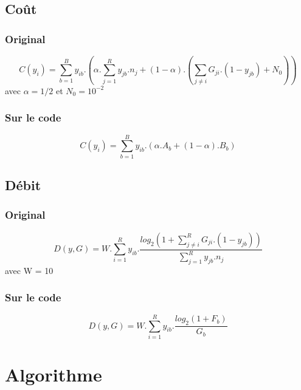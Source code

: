 \documentclass[a4paper,sans,titlepage,10pt]{article}
\begin{document}
\subsection{Coût}
\subsubsection{Original}
\begin{displaymath}
C(y_i)= \sum\limits_{b=1}^By_{ib}.\left(\alpha.\sum\limits_{j=1}^Ry_{jb}.n_j+(1-\alpha).(\sum\limits_{j\neq i}G_{ji}.(1-y_{jb})+N_0)\right)
\end{displaymath}
avec $\alpha = 1/2$ et  $N_0 = 10^{-2}$
\subsubsection{Sur le code}
\begin{displaymath}
C(y_i)= \sum\limits_{b=1}^By_{ib}.(\alpha.A_b+(1-\alpha).B_b)
\end{displaymath}
\subsection{Débit}
\subsubsection{Original}
\begin{displaymath}
D(y,G)=W.\sum\limits_{i=1}^Ry_{ib}.\frac{log_2\left(1+\sum\limits_{j \neq i}^RG_{ji}.(1-y_{jb})\right)}{\sum\limits_{j=1}^Ry_{jb}.n_j}
\end{displaymath}
avec W = 10
\subsubsection{Sur le code}
\begin{displaymath}
D(y,G)=W.\sum\limits_{i=1}^Ry_{ib}.\frac{log_2(1+F_b)}{G_b}
\end{displaymath}
\section{Algorithme}
\end{document}
